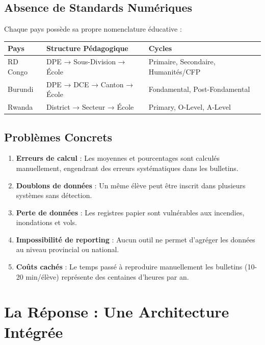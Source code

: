 \documentclass[12pt,a4paper,oneside]{report}
\begin{document}
\subsection{Absence de Standards Numériques}

Chaque pays possède sa propre nomenclature éducative :

\begin{center}
\begin{tabularx}{\textwidth}{l X X}
\toprule
\textbf{Pays} & \textbf{Structure Pédagogique} & \textbf{Cycles} \\
\midrule
RD Congo & DPE → Sous-Division → École & Primaire, Secondaire, Humanités/CFP \\
Burundi & DPE → DCE → Canton → École & Fondamental, Post-Fondamental \\
Rwanda & District → Secteur → École & Primary, O-Level, A-Level \\
\bottomrule
\end{tabularx}
\end{center}

\subsection{Problèmes Concrets}

\begin{warnbox}
\begin{enumerate}
  \item \textbf{Erreurs de calcul} : Les moyennes et pourcentages sont calculés manuellement, engendrant des erreurs systématiques dans les bulletins.
  \item \textbf{Doublons de données} : Un même élève peut être inscrit dans plusieurs systèmes sans détection.
  \item \textbf{Perte de données} : Les registres papier sont vulnérables aux incendies, inondations et vols.
  \item \textbf{Impossibilité de reporting} : Aucun outil ne permet d'agréger les données au niveau provincial ou national.
  \item \textbf{Coûts cachés} : Le temps passé à reproduire manuellement les bulletins (10-20 min/élève) représente des centaines d'heures par an.
\end{enumerate}
\end{warnbox}

\section{La Réponse : Une Architecture Intégrée}
\end{document}
